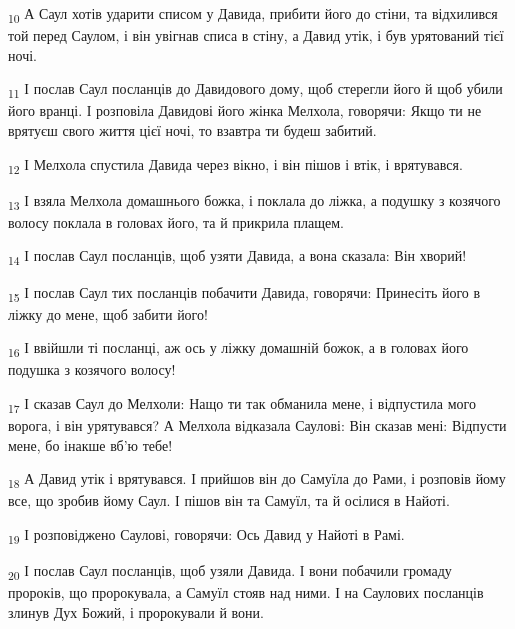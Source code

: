 \begin{tcolorbox}
\textsubscript{10} А Саул хотів ударити списом у Давида, прибити його до стіни, та відхилився той перед Саулом, і він увігнав списа в стіну, а Давид утік, і був урятований тієї ночі.
\end{tcolorbox}
\begin{tcolorbox}
\textsubscript{11} І послав Саул посланців до Давидового дому, щоб стерегли його й щоб убили його вранці. І розповіла Давидові його жінка Мелхола, говорячи: Якщо ти не врятуєш свого життя цієї ночі, то взавтра ти будеш забитий.
\end{tcolorbox}
\begin{tcolorbox}
\textsubscript{12} І Мелхола спустила Давида через вікно, і він пішов і втік, і врятувався.
\end{tcolorbox}
\begin{tcolorbox}
\textsubscript{13} І взяла Мелхола домашнього божка, і поклала до ліжка, а подушку з козячого волосу поклала в головах його, та й прикрила плащем.
\end{tcolorbox}
\begin{tcolorbox}
\textsubscript{14} І послав Саул посланців, щоб узяти Давида, а вона сказала: Він хворий!
\end{tcolorbox}
\begin{tcolorbox}
\textsubscript{15} І послав Саул тих посланців побачити Давида, говорячи: Принесіть його в ліжку до мене, щоб забити його!
\end{tcolorbox}
\begin{tcolorbox}
\textsubscript{16} І ввійшли ті посланці, аж ось у ліжку домашній божок, а в головах його подушка з козячого волосу!
\end{tcolorbox}
\begin{tcolorbox}
\textsubscript{17} І сказав Саул до Мелхоли: Нащо ти так обманила мене, і відпустила мого ворога, і він урятувався? А Мелхола відказала Саулові: Він сказав мені: Відпусти мене, бо інакше вб'ю тебе!
\end{tcolorbox}
\begin{tcolorbox}
\textsubscript{18} А Давид утік і врятувався. І прийшов він до Самуїла до Рами, і розповів йому все, що зробив йому Саул. І пішов він та Самуїл, та й осілися в Найоті.
\end{tcolorbox}
\begin{tcolorbox}
\textsubscript{19} І розповіджено Саулові, говорячи: Ось Давид у Найоті в Рамі.
\end{tcolorbox}
\begin{tcolorbox}
\textsubscript{20} І послав Саул посланців, щоб узяли Давида. І вони побачили громаду пророків, що пророкувала, а Самуїл стояв над ними. І на Саулових посланців злинув Дух Божий, і пророкували й вони.
\end{tcolorbox}

